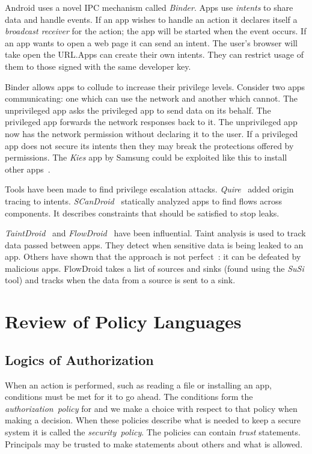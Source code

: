 \documentclass[a4paper]{article}
\begin{document}
Android uses a novel IPC mechanism called \emph{Binder}. Apps use \emph{intents}
to share data and handle events. If an app wishes to handle an
 action it declares itself a \emph{broadcast receiver} for
the action; the app will be started when the event occurs.  If an app wants to
open a web page it can send an  intent. The user's browser
will take open the URL.\@ Apps can create their own intents. They can restrict
usage of them to those signed with the same developer key.

Binder allows apps to collude to increase their privilege levels.  Consider two
apps communicating: one which can use the network and another which cannot.  The
unprivileged app asks the privileged app to send data on its behalf. The
privileged app forwards the network responses back to it. The unprivileged app
now has the network permission without declaring it to the user.  If a
privileged app does not secure its intents then they may break the protections
offered by permissions. The \emph{Kies} app by Samsung could be exploited like
this to install other apps~\cite{moulu:8btkPowj}.

Tools have been made to find privilege escalation attacks.
\emph{Quire}~\cite{Bugiel:2012ui} added origin tracing to intents.
\emph{SCanDroid}~\cite{Fuchs:2009vi} statically analyzed apps to find flows
across components. It describes constraints that should be satisfied to stop
leaks. 

\emph{TaintDroid}~\cite{Enck:2010uw} and \emph{FlowDroid}~\cite{Fritz:2013vi}
have been influential.  Taint analysis is used to track data passed between
apps. They detect when sensitive data is being leaked to an app. Others have
shown that the approach is not perfect~\cite{Sarwar:2013ta}: it can be defeated
by malicious apps.  FlowDroid takes a list of sources and sinks (found using the
\emph{SuSi} tool\cite{Rasthofer:2014uq}) and tracks when the data from a source
is sent to a sink.  

\section{Review of Policy Languages}

\subsection{Logics of Authorization}

When an action is performed, such as reading a file or installing an app,
conditions must be met for it to go ahead. The conditions form the
\emph{authorization~policy} for and we make a choice with respect to that policy
when making a decision. When these policies describe what
is needed to keep a secure system it is called the \emph{security~policy}.  The
policies can contain \emph{trust} statements. Principals may be trusted to make
statements about others and what is allowed.
\end{document}
